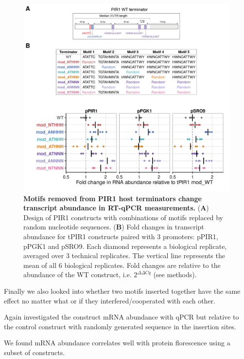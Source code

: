 \documentclass{SBCbookchapter}
\begin{document}
\begin{figure}[p]

{\centering \includegraphics[width=0.98\linewidth]{figures/tPIR1_design_and_qpcr} 

}

\caption{\textbf{Motifs removed from PIR1 host terminators change transcript abundance in RT-qPCR measurements.} (\textbf{A}) Design of PIR1 constructs with combinations of motifs replaced by random nucleotide sequences. (\textbf{B}) Fold changes in transcript abundance for tPIR1 constructs paired with 3 promoters: pPIR1, pPGK1 and pSRO9. Each diamond represents a biological replicate, averaged over 3 technical replicates. The vertical line represents the mean of all 6 biological replicates. Fold changes are relative to the abundance of the WT construct, i.e. $2^{\Delta\Delta Cq}$ (see methods).}\label{fig:tPIR1-design-and-qpcr}
\end{figure}

Finally we also looked into whether two motifs inserted together have the same effect no matter what or if they interfered/cooperated with each other.

Again investigated the construct mRNA abundance with qPCR but relative to the control construct with randomly generated sequence in the insertion sites.

We found mRNA abundance correlates well with protein florescence using a subset of constructs.
\end{document}
